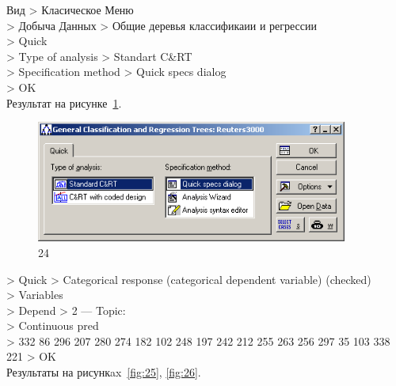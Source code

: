 Вид > Класическое Меню \\
> Добыча Данных > Общие деревья классификаии и регрессии \\
> Quick \\
> Type of analysis > Standart C\&RT \\
> Specification method > Quick specs dialog \\
> OK \\

Результат на рисунке~\ref{fig:24}.

\begin{figure}[!h]
  \centering

  \includegraphics[height=4cm]
  {inc/24.PNG}

  \caption{24}

  \label{fig:24}
\end{figure}

\newpage

> Quick > Categorical response (categorical dependent variable) (checked) \\
> Variables \\
> Depend > 2 — Topic: \\
> Continuous pred\\
> 332 86 296 207 280 274 182 102 248 197 242 212 255 263 256 297 35 103 338 221 > OK\\

Результаты на рисункax~\ref{fig:25}, \ref{fig:26}.


